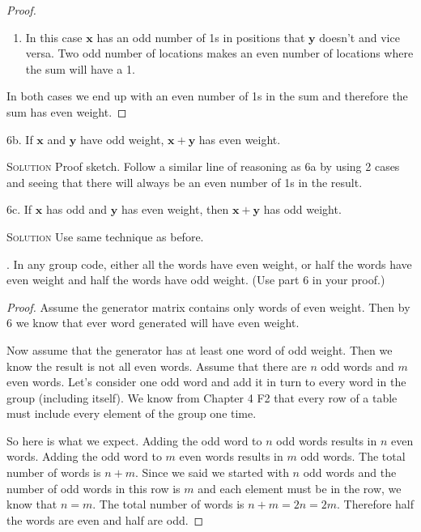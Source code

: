 \documentclass[twoside]{amsart}
\newcommand{\solution}{\textsc{Solution}\xspace}
\begin{document}
\begin{enumerate}[A.]
\begin{proof}
\begin{enumerate}[(1)]
      \item In this case $\mathbf{x}$ has an odd number of 1s
      in positions that $\mathbf{y}$ doesn't and vice versa. Two 
      odd number of locations makes an even number of locations where
      the sum will have a 1. 
   \end{enumerate} 
   In both cases we end up with an even number of 1s in the sum and
   therefore the sum has even weight.
   \end{proof}

   \noindent 6b. If $\mathbf{x}$ and $\mathbf{y}$ have odd weight,
   $\mathbf{x}+\mathbf{y}$ has even weight.
   
   \noindent \solution Proof sketch. Follow a similar line of reasoning
   as 6a by using 2 cases and seeing that there will always be an even
   number of 1s in the result.

   \vspace{10pt}
   \noindent 6c. If $\mathbf{x}$ has odd and $\mathbf{y}$ has even weight,
   then $\mathbf{x}+\mathbf{y}$ has odd weight.
   
   \noindent \solution Use same technique as before.

   . In any group code, either all the words have even weight,
   or half the words have even weight and half the words have odd 
   weight. (Use part 6 in your proof.)

   \noindent 
   \begin{proof}
   Assume the generator matrix contains only words of even weight. Then
   by 6 we know that ever word generated will have even weight.

   Now assume that the generator has at least one word of odd weight. 
   Then we know the result is not all even words. 
   Assume that there are $n$ odd words and $m$ even words.
   Let's consider one odd word and add it in turn to every word 
   in the group (including itself). We know from Chapter 4 F2 that every row
   of a table must include every element of the group one time.

   So here is what we expect. Adding the odd word to $n$ odd words
   results in $n$ even words. Adding the odd word to $m$ even words
   results in $m$ odd words. The total number of words is $n+m$.
   Since we said we started with $n$ odd words and the number of odd
   words in this row is $m$ and each element must be in the row,
   we know that $n=m$. The total number of words is $n+m = 2n = 2m$.
   Therefore half the words are even and half are odd.
   \end{proof}


\end{enumerate}
\end{document}
